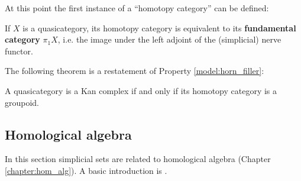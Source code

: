     At this point the first instance of a ``homotopy category'' can be defined:
    \begin{property}
        If $X$ is a quasicategory, its homotopy category is equivalent to its \textbf{fundamental category} $\pi_1X$, i.e. the image under the left adjoint of the (simplicial) nerve functor.
    \end{property}

    The following theorem is a restatement of Property \ref{model:horn_filler}:
    \begin{theorem}[Joyal]
        A quasicategory is a Kan complex if and only if its homotopy category is a groupoid.
    \end{theorem}

\subsection{Homological algebra}

    In this section simplicial sets are related to homological algebra (Chapter \ref{chapter:hom_alg}). A basic introduction is \cite{master2020homology}.


